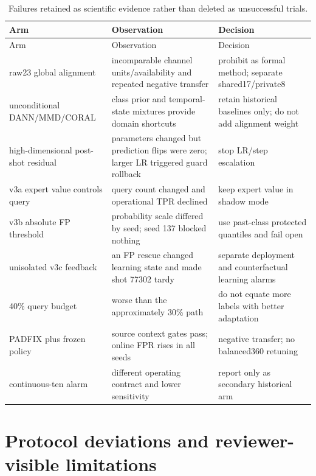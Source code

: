\documentclass[10pt]{article}
\begin{document}
\begin{longtable}{@{}p{34mm}p{56mm}p{70mm}@{}}
\caption{Failures retained as scientific evidence rather than deleted as unsuccessful trials.}\\
\toprule
Arm & Observation & Decision \\
\midrule
\endfirsthead
\toprule
Arm & Observation & Decision \\
\midrule
\endhead
raw23 global alignment & incomparable channel units/availability and repeated negative transfer & prohibit as formal method; separate shared17/private8 \\
unconditional DANN/MMD/CORAL & class prior and temporal-state mixtures provide domain shortcuts & retain historical baselines only; do not add alignment weight \\
high-dimensional post-shot residual & parameters changed but prediction flips were zero; larger LR triggered guard rollback & stop LR/step escalation \\
v3a expert value controls query & query count changed and operational TPR declined & keep expert value in shadow mode \\
v3b absolute FP threshold & probability scale differed by seed; seed 137 blocked nothing & use past-class protected quantiles and fail open \\
unisolated v3c feedback & an FP rescue changed learning state and made shot 77302 tardy & separate deployment and counterfactual learning alarms \\
40\% query budget & worse than the approximately 30\% path & do not equate more labels with better adaptation \\
PADFIX plus frozen policy & source context gates pass; online FPR rises in all seeds & negative transfer; no balanced360 retuning \\
continuous-ten alarm & different operating contract and lower sensitivity & report only as secondary historical arm \\
\bottomrule
\end{longtable}

\section{Protocol deviations and reviewer-visible limitations}
\end{document}
